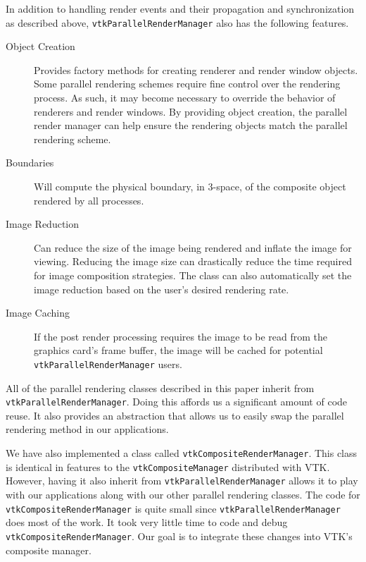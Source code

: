 \documentclass[twocolumn]{article}
\newcommand{\cidentifier}[1]{\texttt{#1}}
\begin{document}
  In addition to handling render events and their propagation and
  synchronization as described above,
  \cidentifier{vtk\-Parallel\-Render\-Manager} also has the following
  features.
  \begin{description}
    \item [Object Creation] Provides factory methods for creating renderer
      and render window objects.  Some parallel rendering schemes require
      fine control over the rendering process.  As such, it may become
      necessary to override the behavior of renderers and render windows.
      By providing object creation, the parallel render manager can help
      ensure the rendering objects match the parallel rendering scheme.
    \item [Boundaries] Will compute the physical boundary, in 3-space, of
      the composite object rendered by all processes.
    \item [Image Reduction] Can reduce the size of the image being rendered
      and inflate the image for viewing.  Reducing the image size can
      drastically reduce the time required for image composition
      strategies.  The class can also automatically set the image reduction
      based on the user's desired rendering rate.
    \item [Image Caching] If the post render processing requires the image
      to be read from the graphics card's frame buffer, the image will be
      cached for potential \cidentifier{vtk\-Parallel\-Render\-Manager}
      users.
  \end{description}

  All of the parallel rendering classes described in this paper inherit
  from \cidentifier{vtk\-Parallel\-Render\-Manager}.  Doing this affords us
  a significant amount of code reuse.  It also provides an abstraction that
  allows us to easily swap the parallel rendering method in our
  applications.

  We have also implemented a class called
  \cidentifier{vtk\-Composite\-Render\-Manager}.  This class is identical
  in features to the \cidentifier{vtk\-Composite\-Manager} distributed with
  VTK.  However, having it also inherit from
  \cidentifier{vtk\-Parallel\-Render\-Manager} allows it to play with our
  applications along with our other parallel rendering classes.  The code
  for \cidentifier{vtk\-Composite\-Render\-Manager} is quite small since
  \cidentifier{vtk\-Parallel\-Render\-Manager} does most of the work.  It
  took very little time to code and debug
  \cidentifier{vtk\-Composite\-Render\-Manager}.  Our goal is to integrate
  these changes into VTK's composite manager.
\end{document}
